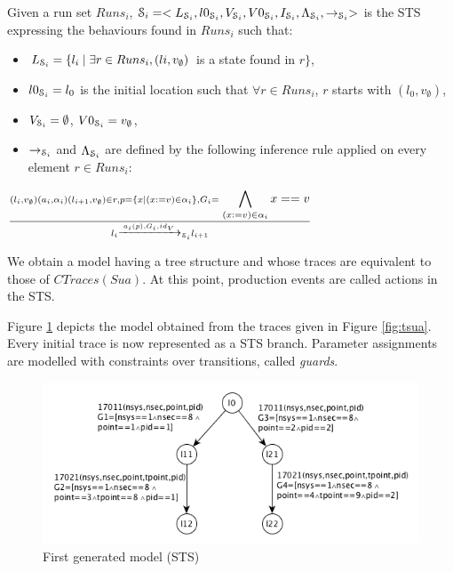 \begin{definition}
  Given a run set $Runs_i$, $\EuScript{S}_i=<L_{\EuScript{S}_i},
  l0_{\EuScript{S}_i},V_{\EuScript{S}_i}, V0_{\EuScript{S}_i},
  I_{\EuScript{S}_i},\\
  \Lambda_{\EuScript{S}_i},\rightarrow_{\EuScript{S}_i}>$ is the
  STS expressing the behaviours found in $Runs_i$ such that:

	\begin{itemize}
    \item $L_{\EuScript{S}_i}= \{l_i \mid \exists r\in Runs_i,
      (li,v_\emptyset)$ is a state found in $r\}$,

    \item $l0_{\EuScript{S}_i} = l_0$ is the initial location
      such that $\forall r \in Runs_i$, $r$ starts with
      $(l_0,v_\emptyset)$,

    \item $V_{\EuScript{S}_i}=\emptyset$,
      $V0_{\EuScript{S}_i}=v_\emptyset$,

    \item $\rightarrow_{\EuScript{S}_i}$ and
      $\Lambda_{\EuScript{S}_i}$ are defined by the following
      inference rule applied on every element $r\in Runs_i$:
	\end{itemize}

  \begin{center}
    $\frac{(l_i,v_\emptyset) (a_i,\alpha_i) (l_{i+1},v_\emptyset)
    \in r, p=\{x \mid (x:=v)\in \alpha_i \}, G_i=\displaystyle
  \bigwedge_{(x:=v)\in \alpha_i}x==v}{l_i \xrightarrow{a_i(p),G_i,id_V}_{\EuScript{S}_i} l_{i+1}}$
  \end{center}


  \label{IOSTS_tree}
\end{definition}

We obtain a model having a tree structure and whose traces are
equivalent to those of $CTraces(Sua)$. At this point, production events
are called actions in the STS.

Figure \ref{fig:firstmodel} depicts the model obtained from the
traces given in Figure \ref{fig:tsua}. Every initial trace is now
represented as a STS branch. Parameter assignments are modelled
with constraints over transitions, called \textit{guards}.

\begin{figure}[H]
  \includegraphics[width=1.0\linewidth]{figures/STS1.png}

  \caption{First generated model (STS)}
  \label{fig:firstmodel}
\end{figure}

